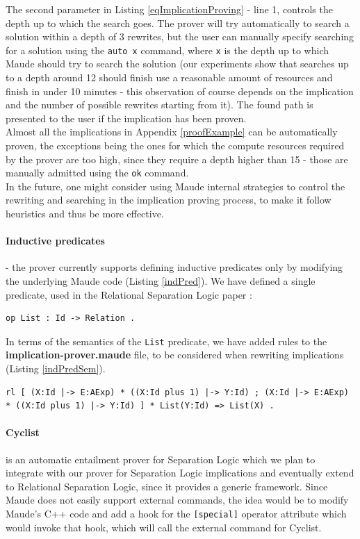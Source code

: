 \documentclass[12pt,a4paper]{article}
\begin{document}
The second parameter in Listing \ref{eqImplicationProving} - line 1, controls the depth up to which the search goes. The prover will try automatically to search a solution within a depth of 3 rewrites, but the user can manually specify searching for a solution using the \texttt{auto x} command, where \texttt{x} is the depth up to which Maude should try to search the solution (our experiments show that searches up to a depth around 12 should finish use a reasonable amount of resources and finish in under 10 minutes - this observation of course depends on the implication and the number of possible rewrites starting from it). The found path is presented to the user if the implication has been proven. 
\\

Almost all the implications in Appendix \ref{proofExample} can be automatically proven, the exceptions being the ones for which the compute resources required by the prover are too high, since they require a depth higher than 15 - those are manually admitted using the \texttt{ok} command.
\\

In the future, one might consider using Maude internal strategies \cite{manual} to control the rewriting and searching in the implication proving process, to make it follow heuristics and thus be more effective.
\paragraph{Inductive predicates} - the prover currently supports defining inductive predicates only by modifying the underlying Maude code (Listing \ref{indPred}). We have defined a single predicate, used in the Relational Separation Logic paper \cite{relational} :
\begin{lstlisting}[caption=Predicate syntax definition,label=indPred]
op List : Id -> Relation . 
\end{lstlisting}
In terms of the semantics of the \texttt{List} predicate, we have added rules to the \textbf{implication-prover.maude} file, to be considered when rewriting implications (Listing \ref{indPredSem}).
\begin{lstlisting}[caption=Example of rule interpreting the List predicate during implication proving,label=indPredSem]
rl [ (X:Id |-> E:AExp) * ((X:Id plus 1) |-> Y:Id) ; (X:Id |-> E:AExp) * ((X:Id plus 1) |-> Y:Id) ] * List(Y:Id) => List(X) .
\end{lstlisting}
\paragraph{Cyclist}\cite{cyclist} \cite{cyclistSite} is an automatic entailment prover for Separation Logic which we plan to integrate with our prover for Separation Logic implications and eventually extend to Relational Separation Logic, since it provides a generic framework. Since Maude does not easily support external commands, the idea would be to modify Maude's C++ code and add a hook for the \texttt{[special]} operator attribute which would invoke that hook, which will call the external command for Cyclist.
\end{document}
